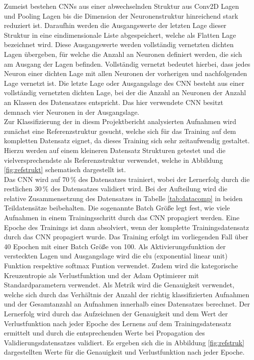 Zumeist bestehen CNNs aus einer abwechselnden Struktur aus Conv2D Lagen und Pooling Lagen bis die Dimension der Neuronenstruktur hinreichend stark reduziert ist. Daraufhin werden die Ausgangswerte der letzten Lage dieser Struktur in eine eindimensionale Liste abgespeichert, welche als Flatten Lage bezeichnet wird. Diese Ausgangswerte werden vollständig vernetzten dichten Lagen übergeben, für welche die Anzahl an Neuronen definiert werden, die sich am Ausgang der Lagen befinden. Vollständig vernetzt bedeutet hierbei, dass jedes Neuron einer dichten Lage mit allen Neuronen der vorherigen und nachfolgenden Lage vernetzt ist. Die letzte Lage oder Ausgangslage des CNN besteht aus einer vollständig vernetzten dichten Lage, bei der die Anzahl an Neuronen der Anzahl an Klassen des Datensatzes entspricht. Das hier verwendete CNN besitzt demnach vier Neuronen in der Ausgangslage. \\ 
Zur Klassifizierung der in diesm Projektbericht analysierten Aufnahmen wird zunächst eine Referenzstruktur gesucht, welche sich für das Training auf dem kompletten Datensatz eignet, da dieses Training sich sehr zeitaufwendig gestaltet. Hierzu werden auf einem kleineren Datensatz Strukturen getestet und die vielversprechendste als Referenzstruktur verwendet, welche in Abbildung \ref{fig:refstrukt} schematisch dargestellt ist. \\
Das CNN wird auf $70\,\%$ des Datensatzes trainiert, wobei der Lernerfolg durch die restlichen $30\,\%$ des Datensatzes validiert wird. Bei der Aufteilung wird die relative Zusammensetzung des Datensatzes  in Tabelle \ref{tab:datacomp} in beiden Teildatensätze beibehalten. Die sogenannte Batch Grö{\ss}e legt fest, wie viele Aufnahmen in einem Trainingsschritt durch das CNN propagiert werden. Eine Epoche des Trainings ist dann absolviert, wenn der komplette Trainingsdatensatz durch das CNN propagiert wurde. Das Training erfolgt im vorliegenden Fall über 40 Epochen mit einer Batch Grö{\ss}e von 100. Als Aktivierungsfunktion der versteckten Lagen und Ausgangslage wird die elu (exponential linear unit) Funktion respektive softmax Funtion verwendet. Zudem wird die kategorische Kreuzentropie als Verlustfunktion und der Adam Optimierer \cite{Adam} mit Standardparametern verwendet. Als Metrik wird die Genauigkeit verwendet, welche sich durch das Verhältnis der Anzahl der richtig klassifizierten Aufnahmen und der Gesamtanzahl an Aufnahmen innerhalb eines Datensatzes berechnet. Der Lernerfolg wird durch das Aufzeichnen der Genauigkeit und dem Wert der Verlustfunktion nach jeder Epoche des Lernens auf dem Trainingsdatensatz ermittelt und durch die entsprechenden Werte bei Propagation des Validierungsdatensatzes validiert. Es ergeben sich die in Abbildung \ref{fig:refstruk} dargestellten Werte für die Genauigkeit und Verlustfunktion nach jeder Epoche.\\
